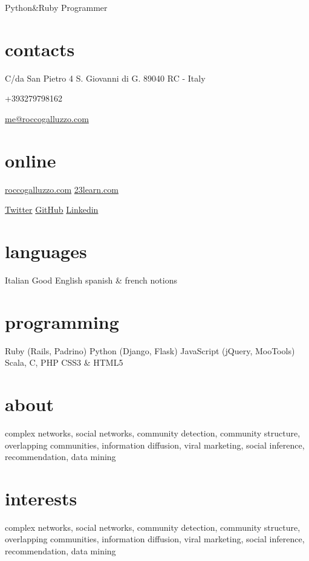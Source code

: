 \documentclass[print]{cv}
\begin{document}
       {Python\&Ruby Programmer}

\begin{aside}
\section{contacts}
    C/da San Pietro 4
    S. Giovanni di G.
    89040 RC - Italy\par\smallskip
   +393279798162\par\smallskip
	\href{mailto:me@roccogalluzzo.com}{me@roccogalluzzo.com}
	\section{online}
	\href{http://roccogalluzzo.com}{roccogalluzzo.com}
           \href{http://23learn.com}{23learn.com}\par\smallskip
	\href{http://twitter.com/byterussian}{Twitter}
           \href{https://github.com/byterussian}{GitHub}
           \href{http://www.linkedin.com/in/roccogalluzzo}{Linkedin}
  \section{languages}
    Italian
    Good English 
    spanish \& french notions
  \section{programming}
    Ruby
    (Rails, Padrino)
    Python
    (Django, Flask)
    JavaScript
    (jQuery, MooTools)
    Scala, C, PHP
    CSS3 \& HTML5
\end{aside}

\section{about}

complex networks, social networks, community detection, community structure,
overlapping communities, information diffusion, viral marketing, social
inference, recommendation, data mining

\section{interests}

complex networks, social networks, community detection, community structure,
overlapping communities, information diffusion, viral marketing, social
inference, recommendation, data mining
\end{document}
